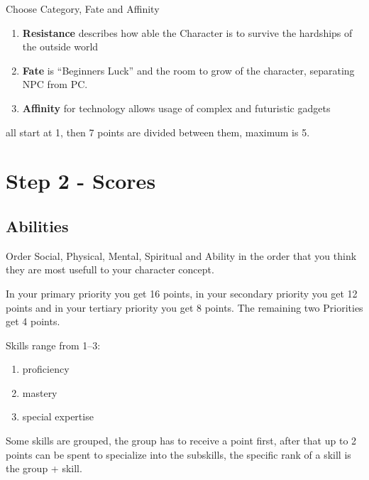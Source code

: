 \documentclass[a4paper]{book}
\begin{document}
    Choose Category, Fate and Affinity\par
    \begin{enumerate}
        \item \textbf{Resistance} describes how able the Character is to survive the hardships of the outside world
        \item \textbf{Fate} is ``Beginners Luck'' and the room to grow of the character, separating NPC from PC\@.
        \item \textbf{Affinity} for technology allows usage of complex and futuristic gadgets
    \end{enumerate}
    all start at 1, then 7 points are divided between them, maximum is 5.

    \section{Step 2 - Scores}\label{sec:step2-scores}
    \subsection{Abilities}\label{subsec:abilities}
    Order Social, Physical, Mental, Spiritual and Ability in the order that you think they are most
    usefull to your character concept. \par
    In your primary priority you get 16 points, in your secondary priority you get 12 points and in your tertiary
    priority you get 8 points.
    The remaining two Priorities get 4 points.\par
    Skills range from 1--3:
    \begin{enumerate}
        \item proficiency
        \item mastery
        \item special expertise
    \end{enumerate}
    Some skills are grouped, the group has to receive a point first, after that up to 2 points can be spent to
    specialize into the subskills, the specific rank of a skill is the group + skill.
\end{document}
